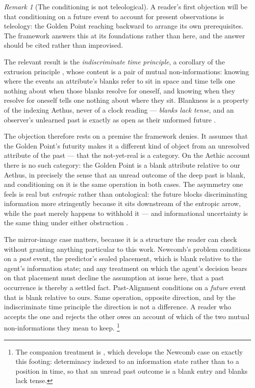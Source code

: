 \documentclass[11pt]{article}
\numberwithin{equation}{section}
\theoremstyle{plain}
\theoremstyle{definition}
\theoremstyle{remark}
\newtheorem{remark}[theorem]{Remark}
\begin{document}
\begin{remark}[The conditioning is not teleological]
\label{gc:rem:teleology}
A reader's first objection will be that conditioning on a future event
to account for present observations is teleology: the Golden Point
reaching backward to arrange its own prerequisites. The framework
answers this at its foundations rather than here, and the answer should
be cited rather than improvised.

The relevant result is the \emph{indiscriminate time principle}, a
corollary of the extrusion principle \cite{Aethus}, whose content is a
pair of mutual non-informations: knowing where the events an attribute's
blanks refer to sit in space and time tells one nothing about when those
blanks resolve for oneself, and knowing when they resolve for oneself
tells one nothing about where they sit. Blankness is a property of the
indexing Aethus, never of a clock reading --- \emph{blanks lack tense},
and an observer's unlearned past is exactly as open as their unformed
future \cite{AethusBrief}.

The objection therefore rests on a premise the framework denies. It
assumes that the Golden Point's futurity makes it a different kind of
object from an unresolved attribute of the past --- that the not-yet-real
is a category. On the Aethic account there is no such category: the
Golden Point is a blank attribute relative to our Aethus, in precisely
the sense that an unread outcome of the deep past is blank, and
conditioning on it is the same operation in both cases. The asymmetry
one feels is real but \emph{entropic} rather than ontological: the
future blocks discriminating information more stringently because it
sits downstream of the entropic arrow, while the past merely happens to
withhold it --- and informational uncertainty is the same thing under
either obstruction \cite{Aethus}.

The mirror-image case matters, because it is a structure the
reader can check without granting anything particular to this work.
Newcomb's problem conditions on a \emph{past} event, the predictor's
sealed placement, which is blank relative to the agent's information
state; and any treatment on which the agent's decision bears on that
placement must decline the assumption at issue here, that a past
occurrence is thereby a settled fact. Past-Alignment conditions on a
\emph{future} event that is blank relative to ours. Same operation,
opposite direction, and by the indiscriminate time principle the
direction is not a difference. A reader who accepts the one and rejects
the other owes an account of which of the two mutual non-informations
they mean to keep.%
\footnote{The companion treatment is \cite{AethusDecision}, which develops
the Newcomb case on exactly this footing: determinacy indexed to an
information state rather than to a position in time, so that an unread past
outcome is a blank entry and blanks lack tense.}


\end{remark}
\end{document}
